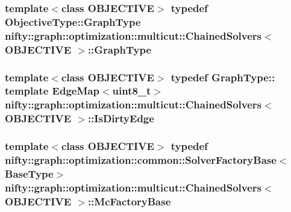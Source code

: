 \subsubsection[{Graph\+Type}]{\setlength{\rightskip}{0pt plus 5cm}template$<$class O\+B\+J\+E\+C\+T\+I\+V\+E$>$ typedef Objective\+Type\+::\+Graph\+Type {\bf nifty\+::graph\+::optimization\+::multicut\+::\+Chained\+Solvers}$<$ O\+B\+J\+E\+C\+T\+I\+V\+E $>$\+::{\bf Graph\+Type}}\label{classnifty_1_1graph_1_1optimization_1_1multicut_1_1ChainedSolvers_ac2f6903706867e7dc2ed3465862bfb49}
\hypertarget{classnifty_1_1graph_1_1optimization_1_1multicut_1_1ChainedSolvers_af5ef940f03ca7ca1b1b08e5654a27191}{}
\subsubsection[{Is\+Dirty\+Edge}]{\setlength{\rightskip}{0pt plus 5cm}template$<$class O\+B\+J\+E\+C\+T\+I\+V\+E$>$ typedef Graph\+Type\+:: template Edge\+Map$<$uint8\+\_\+t$>$ {\bf nifty\+::graph\+::optimization\+::multicut\+::\+Chained\+Solvers}$<$ O\+B\+J\+E\+C\+T\+I\+V\+E $>$\+::{\bf Is\+Dirty\+Edge}}\label{classnifty_1_1graph_1_1optimization_1_1multicut_1_1ChainedSolvers_af5ef940f03ca7ca1b1b08e5654a27191}
\hypertarget{classnifty_1_1graph_1_1optimization_1_1multicut_1_1ChainedSolvers_ae2a63d54e80124540754a948c9736a72}{}
\subsubsection[{Mc\+Factory\+Base}]{\setlength{\rightskip}{0pt plus 5cm}template$<$class O\+B\+J\+E\+C\+T\+I\+V\+E$>$ typedef {\bf nifty\+::graph\+::optimization\+::common\+::\+Solver\+Factory\+Base}$<${\bf Base\+Type}$>$ {\bf nifty\+::graph\+::optimization\+::multicut\+::\+Chained\+Solvers}$<$ O\+B\+J\+E\+C\+T\+I\+V\+E $>$\+::{\bf Mc\+Factory\+Base}}\label{classnifty_1_1graph_1_1optimization_1_1multicut_1_1ChainedSolvers_ae2a63d54e80124540754a948c9736a72}
\hypertarget{classnifty_1_1graph_1_1optimization_1_1multicut_1_1ChainedSolvers_a259cf07811ed206783e18959da3351dd}{}
